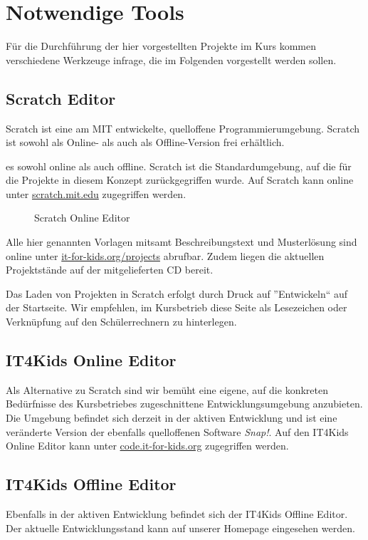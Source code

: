 
\section{Notwendige Tools}
Für die Durchführung der hier vorgestellten Projekte im Kurs kommen verschiedene Werkzeuge infrage, die im Folgenden vorgestellt werden sollen.

\subsection{Scratch Editor}
Scratch ist eine am MIT entwickelte, quelloffene Programmierumgebung. Scratch ist sowohl als Online- als auch als Offline-Version frei erhältlich.

es sowohl online als auch offline. Scratch ist die Standardumgebung, auf die für die Projekte in diesem Konzept zurückgegriffen wurde. Auf Scratch kann online unter \href{https://scratch.mit.edu}{scratch.mit.edu} zugegriffen werden.

\begin{figure}[ht]
	\centering
	\caption[Scratch Online Editor]{Scratch Online Editor}
	\label{fig:scratch}
\end{figure}

Alle hier genannten Vorlagen mitsamt Beschreibungstext und Musterlösung sind online unter \href{http://www.it-for-kids.org/projects}{it-for-kids.org/projects} abrufbar. Zudem liegen die aktuellen Projektstände auf der mitgelieferten CD bereit.

Das Laden von Projekten in Scratch erfolgt durch Druck auf ''Entwickeln`` auf der Startseite. Wir empfehlen, im Kursbetrieb diese Seite als Lesezeichen oder Verknüpfung auf den Schülerrechnern zu hinterlegen.


\subsection{IT4Kids Online Editor}
Als Alternative zu Scratch sind wir bemüht eine eigene, auf die konkreten Bedürfnisse des Kursbetriebes zugeschnittene Entwicklungsumgebung anzubieten. Die Umgebung befindet sich derzeit in der aktiven Entwicklung und ist eine veränderte Version der ebenfalls quelloffenen Software \textit{Snap!}. Auf den IT4Kids Online Editor kann unter \href{http://code.it-for-kids.org}{code.it-for-kids.org} zugegriffen werden.

\subsection{IT4Kids Offline Editor}
Ebenfalls in der aktiven Entwicklung befindet sich der IT4Kids Offline Editor. Der aktuelle Entwicklungsstand kann auf unserer Homepage eingesehen werden.


